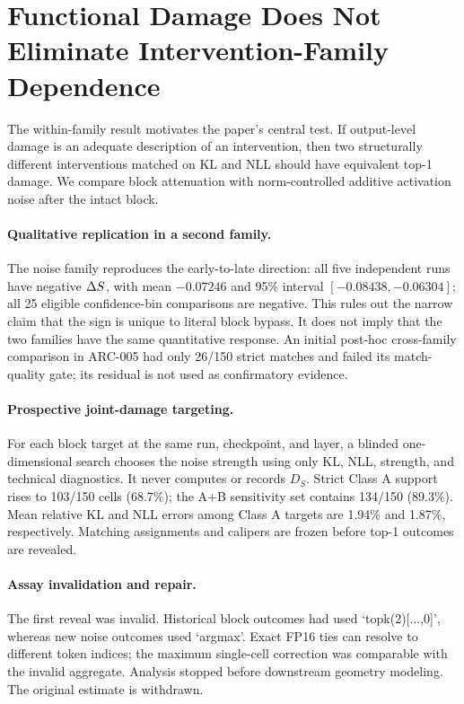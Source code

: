 \section{Functional Damage Does Not Eliminate Intervention-Family Dependence}
\label{sec:family}

The within-family result motivates the paper's central test. If output-level
damage is an adequate description of an intervention, then two structurally
different interventions matched on KL and NLL should have equivalent top-1
damage. We compare block attenuation with norm-controlled additive activation
noise after the intact block.

\paragraph{Qualitative replication in a second family.}
The noise family reproduces the early-to-late direction: all five independent
runs have negative $\Delta S$, with mean $-0.07246$ and 95\% interval
$[-0.08438,-0.06304]$; all 25 eligible confidence-bin comparisons are negative.
This rules out the narrow claim that the sign is unique to literal block
bypass. It does not imply that the two families have the same quantitative
response. An initial post-hoc cross-family comparison in ARC-005 had only
26/150 strict matches and failed its match-quality gate; its residual is not
used as confirmatory evidence.

\paragraph{Prospective joint-damage targeting.}
For each block target at the same run, checkpoint, and layer, a blinded
one-dimensional search chooses the noise strength using only KL, NLL, strength,
and technical diagnostics. It never computes or records $D_S$. Strict Class A
support rises to 103/150 cells (68.7\%); the A+B sensitivity set contains
134/150 (89.3\%). Mean relative KL and NLL errors among Class A targets are
1.94\% and 1.87\%, respectively. Matching assignments and calipers are frozen
before top-1 outcomes are revealed.

\paragraph{Assay invalidation and repair.}
The first reveal was invalid. Historical block outcomes had used
`topk(2)[...,0]', whereas new noise outcomes used `argmax'. Exact FP16 ties can
resolve to different token indices; the maximum single-cell correction was
comparable with the invalid aggregate. Analysis stopped before downstream
geometry modeling. The original estimate is withdrawn.

